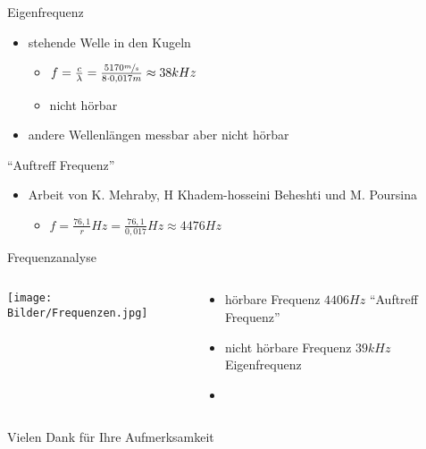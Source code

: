 \documentclass[12pt]{beamer}
\begin{document}
\begin{frame}{Eigenfrequenz}
\begin{itemize}
\item<1-> stehende Welle in den Kugeln
	\begin{itemize}
	\item<2->[$\rightarrow$] $f=\frac{c}{\lambda}=\frac{5170\sfrac{m}{s}}{8\cdot 0,017m}\approx 38kHz$
	\item<3->[$\rightarrow$] nicht hörbar
	\end{itemize}
\item<4-> andere Wellenlängen messbar aber nicht hörbar
\end{itemize}
\end{frame}

\begin{frame}{"`Auftreff Frequenz"'}
\begin{itemize}
\item<1-> Arbeit von K. Mehraby, H Khadem-hosseini Beheshti und M. Poursina
	\begin{itemize}
	\item<2->[$\rightarrow$] $f=\frac{76,1}{r}Hz=\frac{76,1}{0,017}Hz\approx 4476Hz$
	\end{itemize}
\end{itemize}
\end{frame}

\begin{frame}{Frequenzanalyse}
\begin{columns}
\begin{column}{.6\textwidth}
\texttt{[image: Bilder/Frequenzen.jpg]}
\end{column}
\begin{column}{.4\textwidth}
\begin{itemize}
\item<2-> hörbare Frequenz $4406Hz$ "`Auftreff Frequenz"'
\item<3-> nicht hörbare Frequenz $39kHz$ Eigenfrequenz
\item[ ] \ 
\end{itemize}
\end{column}
\end{columns}
\end{frame}

\begin{frame}
\center
{\HUGE Vielen Dank für Ihre Aufmerksamkeit}
\end{frame}
\end{document}
